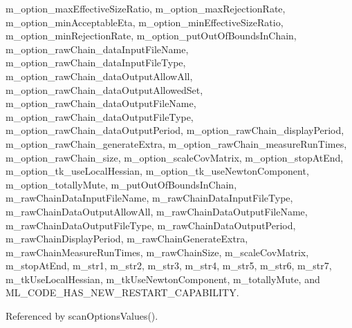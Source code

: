 m\-\_\-option\-\_\-max\-Effective\-Size\-Ratio, m\-\_\-option\-\_\-max\-Rejection\-Rate, m\-\_\-option\-\_\-min\-Acceptable\-Eta, m\-\_\-option\-\_\-min\-Effective\-Size\-Ratio, m\-\_\-option\-\_\-min\-Rejection\-Rate, m\-\_\-option\-\_\-put\-Out\-Of\-Bounds\-In\-Chain, m\-\_\-option\-\_\-raw\-Chain\-\_\-data\-Input\-File\-Name, m\-\_\-option\-\_\-raw\-Chain\-\_\-data\-Input\-File\-Type, m\-\_\-option\-\_\-raw\-Chain\-\_\-data\-Output\-Allow\-All, m\-\_\-option\-\_\-raw\-Chain\-\_\-data\-Output\-Allowed\-Set, m\-\_\-option\-\_\-raw\-Chain\-\_\-data\-Output\-File\-Name, m\-\_\-option\-\_\-raw\-Chain\-\_\-data\-Output\-File\-Type, m\-\_\-option\-\_\-raw\-Chain\-\_\-data\-Output\-Period, m\-\_\-option\-\_\-raw\-Chain\-\_\-display\-Period, m\-\_\-option\-\_\-raw\-Chain\-\_\-generate\-Extra, m\-\_\-option\-\_\-raw\-Chain\-\_\-measure\-Run\-Times, m\-\_\-option\-\_\-raw\-Chain\-\_\-size, m\-\_\-option\-\_\-scale\-Cov\-Matrix, m\-\_\-option\-\_\-stop\-At\-End, m\-\_\-option\-\_\-tk\-\_\-use\-Local\-Hessian, m\-\_\-option\-\_\-tk\-\_\-use\-Newton\-Component, m\-\_\-option\-\_\-totally\-Mute, m\-\_\-put\-Out\-Of\-Bounds\-In\-Chain, m\-\_\-raw\-Chain\-Data\-Input\-File\-Name, m\-\_\-raw\-Chain\-Data\-Input\-File\-Type, m\-\_\-raw\-Chain\-Data\-Output\-Allow\-All, m\-\_\-raw\-Chain\-Data\-Output\-File\-Name, m\-\_\-raw\-Chain\-Data\-Output\-File\-Type, m\-\_\-raw\-Chain\-Data\-Output\-Period, m\-\_\-raw\-Chain\-Display\-Period, m\-\_\-raw\-Chain\-Generate\-Extra, m\-\_\-raw\-Chain\-Measure\-Run\-Times, m\-\_\-raw\-Chain\-Size, m\-\_\-scale\-Cov\-Matrix, m\-\_\-stop\-At\-End, m\-\_\-str1, m\-\_\-str2, m\-\_\-str3, m\-\_\-str4, m\-\_\-str5, m\-\_\-str6, m\-\_\-str7, m\-\_\-tk\-Use\-Local\-Hessian, m\-\_\-tk\-Use\-Newton\-Component, m\-\_\-totally\-Mute, and M\-L\-\_\-\-C\-O\-D\-E\-\_\-\-H\-A\-S\-\_\-\-N\-E\-W\-\_\-\-R\-E\-S\-T\-A\-R\-T\-\_\-\-C\-A\-P\-A\-B\-I\-L\-I\-T\-Y.



Referenced by scan\-Options\-Values().


